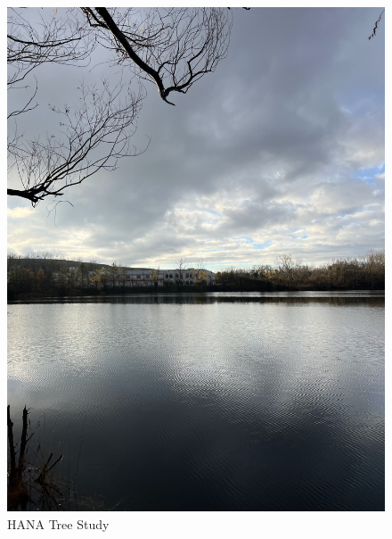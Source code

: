 \documentclass{article}
\begin{document}
\begin{figure}[h!]
\centering
\includegraphics[scale=.1]{Research/HANA/NOV2024/IMG_9830.JPG}
\caption{HANA Tree Study}
\label{fig:HANA}
\end{figure}
\end{document}

